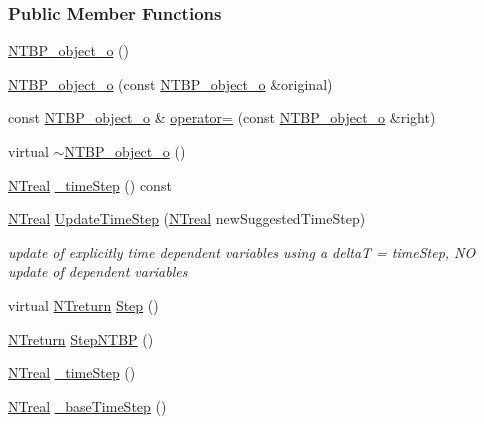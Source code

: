 \subsubsection*{Public Member Functions}
\begin{DoxyCompactItemize}
\item 
\hyperlink{class_n_t_b_p__object__o_acda443a285e1d5dd2041f699de38e6cd}{NTBP\_\-object\_\-o} ()
\item 
\hyperlink{class_n_t_b_p__object__o_a55a6ddb7c1dd6b161ccdf381adc53459}{NTBP\_\-object\_\-o} (const \hyperlink{class_n_t_b_p__object__o}{NTBP\_\-object\_\-o} \&original)
\item 
const \hyperlink{class_n_t_b_p__object__o}{NTBP\_\-object\_\-o} \& \hyperlink{class_n_t_b_p__object__o_a9bec1457cb67ea88eb4fc0eb9393a057}{operator=} (const \hyperlink{class_n_t_b_p__object__o}{NTBP\_\-object\_\-o} \&right)
\item 
virtual \hyperlink{class_n_t_b_p__object__o_aeb2123feff59789e5008365da3569d0a}{$\sim$NTBP\_\-object\_\-o} ()
\item 
\hyperlink{nt__types_8h_a814a97893e9deb1eedcc7604529ba80d}{NTreal} \hyperlink{class_n_t_b_p__object__o_a8b4c49cb53e209bc08e95bbd0d5bf599}{\_\-timeStep} () const 
\item 
\hyperlink{nt__types_8h_a814a97893e9deb1eedcc7604529ba80d}{NTreal} \hyperlink{class_n_t_b_p__object__o_a5fddf11df68181c4afc0718004c52035}{UpdateTimeStep} (\hyperlink{nt__types_8h_a814a97893e9deb1eedcc7604529ba80d}{NTreal} newSuggestedTimeStep)
\begin{DoxyCompactList}\small\item\em update of explicitly time dependent variables using a deltaT = timeStep, NO update of dependent variables \item\end{DoxyCompactList}\item 
virtual \hyperlink{nt__types_8h_ab9564ee8f091e809d21b8451c6683c53}{NTreturn} \hyperlink{class_n_t_b_p__object__o_a28c6694a0772717975a9ef36d7b44adb}{Step} ()
\item 
\hyperlink{nt__types_8h_ab9564ee8f091e809d21b8451c6683c53}{NTreturn} \hyperlink{class_n_t_b_p__object__o_a947822cdfe5895e47892b2074fc94db6}{StepNTBP} ()
\item 
\hyperlink{nt__types_8h_a814a97893e9deb1eedcc7604529ba80d}{NTreal} \hyperlink{class_n_t_b_p__object__o_adb2720621c989f245eeb12d3d4ca023a}{\_\-timeStep} ()
\item 
\hyperlink{nt__types_8h_a814a97893e9deb1eedcc7604529ba80d}{NTreal} \hyperlink{class_n_t_b_p__object__o_a95af3f76b1c1109e9f239956248ad9b5}{\_\-baseTimeStep} ()
\end{DoxyCompactItemize}


